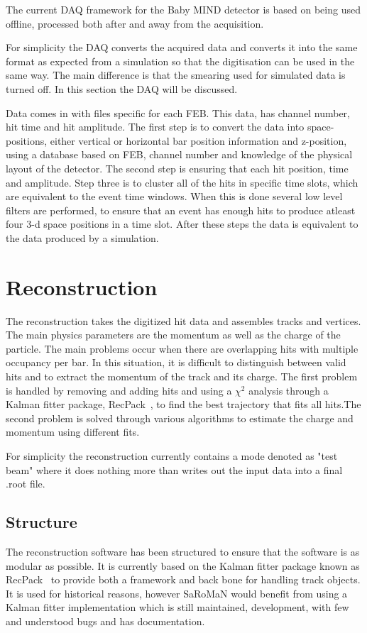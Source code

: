 The current DAQ framework for the Baby MIND detector is based on being used offline, processed both after and away from the acquisition.

For simplicity the DAQ converts the acquired data and converts it into the same format as expected from a simulation so that the digitisation can be used in the same way. The main difference is that the smearing used for simulated data is turned off. In this section the DAQ will be discussed. 

Data comes in with files specific for each FEB. This data, has channel number, hit time and hit amplitude. The first step is to convert the data into space-positions, either vertical or horizontal bar position information and z-position, using a database based on FEB, channel number and knowledge of the physical layout of the detector. The second step is ensuring that each hit position, time and amplitude. Step three is to cluster all of the hits in specific time slots, which are equivalent to the event time windows. When this is done several low level filters are performed, to ensure that an event has enough hits to produce atleast four 3-d space positions in a time slot. After these steps the data is equivalent to the data produced by a simulation.

\pagebreak
\section{Reconstruction}\label{sec:reconstruction}
The reconstruction takes the digitized hit data and assembles tracks and vertices. The main physics parameters are the momentum as well as the charge of the particle. The main problems occur when there are overlapping hits with multiple occupancy per bar. In this situation, it is difficult to distinguish between valid hits and to extract the momentum of the track and its charge.
The first problem is handled by removing and adding hits and using a $\chi^2$ analysis through a Kalman fitter package, RecPack~\cite{RecPack}, to find the best trajectory that fits all hits.The second problem is solved through various algorithms to estimate the charge and momentum using different fits.

For simplicity the reconstruction currently contains a mode denoted as "test beam" where it does nothing more than writes out the input data into a final .root file.

\subsection{Structure}
The reconstruction software has been structured to ensure that the software is as modular as possible. It is currently based on the Kalman fitter package known as RecPack~\cite{RecPack} to provide both a framework and back bone for handling track objects. It is used for historical reasons, however SaRoMaN would benefit from using a Kalman fitter implementation which is still maintained, development, with few and understood bugs and has documentation.

